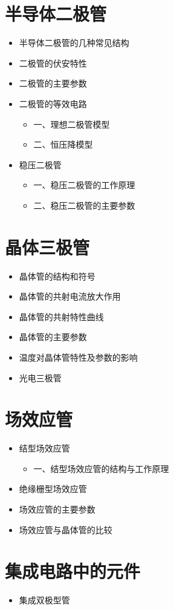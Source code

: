 \section{半导体二极管}
\begin{itemize}
    \item 半导体二极管的几种常见结构
    \item 二极管的伏安特性
    \item 二极管的主要参数
    \item 二极管的等效电路
    \begin{itemize}
        \item 一、理想二极管模型
        \item 二、恒压降模型
    \end{itemize}
    \item 稳压二极管
    \begin{itemize}
        \item 一、稳压二极管的工作原理
        \item 二、稳压二极管的主要参数
    \end{itemize}
\end{itemize}

\section{晶体三极管}
\begin{itemize}
    \item 晶体管的结构和符号
    \item 晶体管的共射电流放大作用
    \item 晶体管的共射特性曲线
    \item 晶体管的主要参数
    \item 温度对晶体管特性及参数的影响
    \item 光电三极管
\end{itemize}

\section{场效应管}
\begin{itemize}
    \item 结型场效应管
    \begin{itemize}
        \item 一、结型场效应管的结构与工作原理
    \end{itemize}
    \item 绝缘栅型场效应管
    \item 场效应管的主要参数
    \item 场效应管与晶体管的比较
\end{itemize}

\section{集成电路中的元件}
\begin{itemize}
    \item 集成双极型管
\end{itemize}